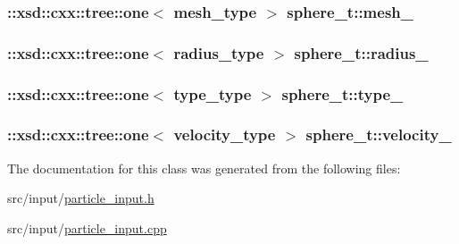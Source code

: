 \subsubsection[{\texorpdfstring{mesh\+\_\+}{mesh_}}]{\setlength{\rightskip}{0pt plus 5cm}\+::xsd\+::cxx\+::tree\+::one$<$ {\bf mesh\+\_\+type} $>$ sphere\+\_\+t\+::mesh\+\_\+\hspace{0.3cm}{\ttfamily [protected]}}\hypertarget{classsphere__t_aa8d9660400db3142a7c2ee5f4549eaa1}{}\label{classsphere__t_aa8d9660400db3142a7c2ee5f4549eaa1}
\subsubsection[{\texorpdfstring{radius\+\_\+}{radius_}}]{\setlength{\rightskip}{0pt plus 5cm}\+::xsd\+::cxx\+::tree\+::one$<$ {\bf radius\+\_\+type} $>$ sphere\+\_\+t\+::radius\+\_\+\hspace{0.3cm}{\ttfamily [protected]}}\hypertarget{classsphere__t_aa162b171f3b45de2aea1436edec60d6a}{}\label{classsphere__t_aa162b171f3b45de2aea1436edec60d6a}
\subsubsection[{\texorpdfstring{type\+\_\+}{type_}}]{\setlength{\rightskip}{0pt plus 5cm}\+::xsd\+::cxx\+::tree\+::one$<$ {\bf type\+\_\+type} $>$ sphere\+\_\+t\+::type\+\_\+\hspace{0.3cm}{\ttfamily [protected]}}\hypertarget{classsphere__t_acfb1c03f858e282c0a91a5f859c2ac63}{}\label{classsphere__t_acfb1c03f858e282c0a91a5f859c2ac63}
\subsubsection[{\texorpdfstring{velocity\+\_\+}{velocity_}}]{\setlength{\rightskip}{0pt plus 5cm}\+::xsd\+::cxx\+::tree\+::one$<$ {\bf velocity\+\_\+type} $>$ sphere\+\_\+t\+::velocity\+\_\+\hspace{0.3cm}{\ttfamily [protected]}}\hypertarget{classsphere__t_ac028ed4884b4438876e24e343029de88}{}\label{classsphere__t_ac028ed4884b4438876e24e343029de88}


The documentation for this class was generated from the following files\+:\begin{DoxyCompactItemize}
\item 
src/input/\hyperlink{particle__input_8h}{particle\+\_\+input.\+h}\item 
src/input/\hyperlink{particle__input_8cpp}{particle\+\_\+input.\+cpp}\end{DoxyCompactItemize}
